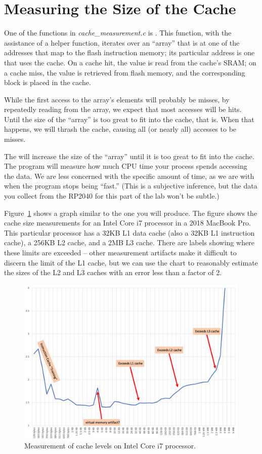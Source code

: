 \section{Measuring the Size of the Cache}

One of the functions in \textit{cache\_measurement.c} is .
This function, with the assistance of a helper function, iterates over an ``array'' that  is at one of the addresses that map to the flash instruction memory;
its particular address is one that uses the cache.
On a cache hit, the value is read from the cache's SRAM;
on a cache miss, the value is retrieved from flash memory, and the corresponding block is placed in the cache.

While the first access to the array's elements will probably be misses,
by repeatedly reading from the array, we expect that most accesses will be hits.
Until the size of the ``array'' is too great to fit into the cache, that is.
When that happens, we will thrash the cache, causing all (or nearly all) accesses to be misses.

The  will increase the size of the ``array'' until it is too great to fit into the cache.
The program will measure how much CPU time your process spends accessing the data.
We are less concerned with the specific amount of time, as we are with when the program stops being ``fast.''
(This is a subjective inference, but the data you collect from the RP2040 for this part of the lab won't be subtle.)

Figure~\ref{fig:LaptopCache} shows a graph similar to the one you will produce.
The figure shows the cache size measurements for an Intel Core i7 processor in a 2018 MacBook Pro.
This particular processor has a 32KB L1 data cache (also a 32KB L1 instruction cache), a 256KB L2 cache, and a 2MB L3 cache.
There are labels showing where these limits are exceeded -- other measurement artifacts make it difficult to discern the limit of the L1 cache, but we can use the chart to reasonably estimate the sizes of the L2 and L3 caches with an error less than a factor of 2.

\begin{figure}
    \centering
    \includegraphics[width=13cm]{IntelImages/IntelI7caches}
    \caption{Measurement of cache levels on Intel Core i7 processor. \label{fig:LaptopCache}}
\end{figure}

